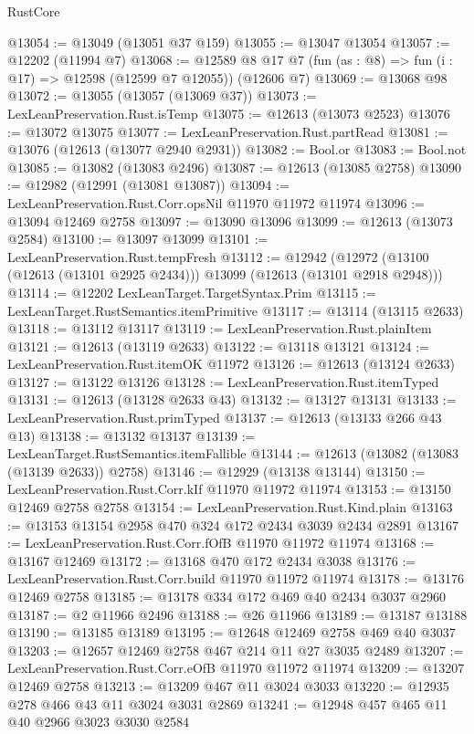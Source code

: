 \begin{lexlean}{RustCore}
\begin{coremodule}
@13054 := @13049 (@13051 @37 @159)
@13055 := @13047 @13054
@13057 := @12202 (@11994 @7)
@13068 := @12589 @8 @17 @7 (fun (as : @8) => fun (i : @17) => @12598 (@12599 @7 @12055)) (@12606 @7)
@13069 := @13068 @98
@13072 := @13055 (@13057 (@13069 @37))
@13073 := LexLeanPreservation.Rust.isTemp
@13075 := @12613 (@13073 @2523)
@13076 := @13072 @13075
@13077 := LexLeanPreservation.Rust.partRead
@13081 := @13076 (@12613 (@13077 @2940 @2931))
@13082 := Bool.or
@13083 := Bool.not
@13085 := @13082 (@13083 @2496)
@13087 := @12613 (@13085 @2758)
@13090 := @12982 (@12991 (@13081 @13087))
@13094 := LexLeanPreservation.Rust.Corr.opsNil @11970 @11972 @11974
@13096 := @13094 @12469 @2758
@13097 := @13090 @13096
@13099 := @12613 (@13073 @2584)
@13100 := @13097 @13099
@13101 := LexLeanPreservation.Rust.tempFresh
@13112 := @12942
    (@12972 (@13100 (@12613 (@13101 @2925 @2434))) @13099 (@12613 (@13101 @2918 @2948)))
@13114 := @12202 LexLeanTarget.TargetSyntax.Prim
@13115 := LexLeanTarget.RustSemantics.itemPrimitive
@13117 := @13114 (@13115 @2633)
@13118 := @13112 @13117
@13119 := LexLeanPreservation.Rust.plainItem
@13121 := @12613 (@13119 @2633)
@13122 := @13118 @13121
@13124 := LexLeanPreservation.Rust.itemOK @11972
@13126 := @12613 (@13124 @2633)
@13127 := @13122 @13126
@13128 := LexLeanPreservation.Rust.itemTyped
@13131 := @12613 (@13128 @2633 @43)
@13132 := @13127 @13131
@13133 := LexLeanPreservation.Rust.primTyped
@13137 := @12613 (@13133 @266 @43 @13)
@13138 := @13132 @13137
@13139 := LexLeanTarget.RustSemantics.itemFallible
@13144 := @12613 (@13082 (@13083 (@13139 @2633)) @2758)
@13146 := @12929 (@13138 @13144)
@13150 := LexLeanPreservation.Rust.Corr.kIf @11970 @11972 @11974
@13153 := @13150 @12469 @2758 @2758
@13154 := LexLeanPreservation.Rust.Kind.plain
@13163 := @13153 @13154 @2958 @470 @324 @172 @2434 @3039 @2434 @2891
@13167 := LexLeanPreservation.Rust.Corr.fOfB @11970 @11972 @11974
@13168 := @13167 @12469
@13172 := @13168 @470 @172 @2434 @3038
@13176 := LexLeanPreservation.Rust.Corr.build @11970 @11972 @11974
@13178 := @13176 @12469 @2758
@13185 := @13178 @334 @172 @469 @40 @2434 @3037 @2960
@13187 := @2 @11966 @2496
@13188 := @26 @11966
@13189 := @13187 @13188
@13190 := @13185 @13189
@13195 := @12648 @12469 @2758 @469 @40 @3037
@13203 := @12657 @12469 @2758 @467 @214 @11 @27 @3035 @2489
@13207 := LexLeanPreservation.Rust.Corr.eOfB @11970 @11972 @11974
@13209 := @13207 @12469 @2758
@13213 := @13209 @467 @11 @3024 @3033
@13220 := @12935 @278 @466 @43 @11 @3024 @3031 @2869
@13241 := @12948
    @457
    @465
    @11
    @40
    @2966
    @3023
    @3030
    @2584

\end{coremodule}
\end{lexlean}
